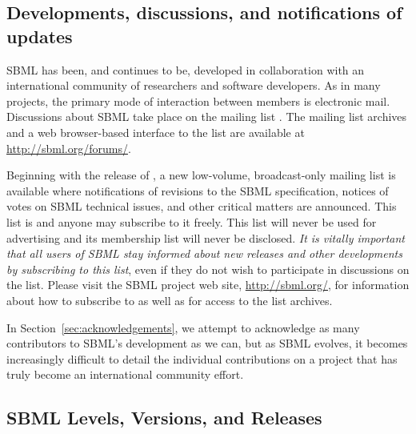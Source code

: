 \subsection{Developments, discussions, and notifications of updates}


SBML has been, and continues to be, developed in collaboration
with an international community of researchers and software
developers.  As in many projects, the primary mode of interaction
between members is electronic mail.  Discussions about SBML take
place on the mailing list
.  The
mailing list archives and a web browser-based interface to the
list are available at \url{http://sbml.org/forums/}.

Beginning with the release of \sbmltwotwo, a new low-volume,
broadcast-only mailing list is available where notifications of
revisions to the SBML specification, notices of votes on SBML
technical issues, and other critical matters are announced.  This
list is 
and anyone may subscribe to it freely.  This list will never be
used for advertising and its membership list will never be
disclosed.  \emph{It is vitally important that all users of SBML
  stay informed about new releases and other developments by
  subscribing to this list}, even if they do not wish to
participate in discussions on the
 list.
Please visit the SBML project web site, \url{http://sbml.org/},
for information about how to subscribe to
 as well
as for access to the list archives.

In Section~\ref{sec:acknowledgements}, we attempt to acknowledge
as many contributors to SBML's development as we can, but as SBML
evolves, it becomes increasingly difficult to detail the
individual contributions on a project that has truly become an
international community effort.


\subsection{SBML Levels, Versions, and Releases}
\label{sec:levels-versions-releases}

